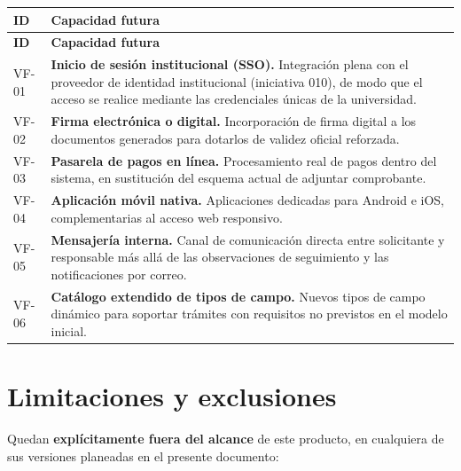 \documentclass[12pt,letterpaper]{report}
\begin{document}
\begin{longtable}{|C{1.6cm}|L{12cm}|}
    \hline
    \textbf{ID} & \textbf{Capacidad futura} \\
    \hline
    \endfirsthead
    \hline
    \textbf{ID} & \textbf{Capacidad futura} \\
    \hline
    \endhead
    \hline
    \endfoot

    VF-01 & \textbf{Inicio de sesión institucional (SSO).} Integración plena con el proveedor de identidad institucional (iniciativa 010), de modo que el acceso se realice mediante las credenciales únicas de la universidad. \\
    \hline
    VF-02 & \textbf{Firma electrónica o digital.} Incorporación de firma digital a los documentos generados para dotarlos de validez oficial reforzada. \\
    \hline
    VF-03 & \textbf{Pasarela de pagos en línea.} Procesamiento real de pagos dentro del sistema, en sustitución del esquema actual de adjuntar comprobante. \\
    \hline
    VF-04 & \textbf{Aplicación móvil nativa.} Aplicaciones dedicadas para Android e iOS, complementarias al acceso web responsivo. \\
    \hline
    VF-05 & \textbf{Mensajería interna.} Canal de comunicación directa entre solicitante y responsable más allá de las observaciones de seguimiento y las notificaciones por correo. \\
    \hline
    VF-06 & \textbf{Catálogo extendido de tipos de campo.} Nuevos tipos de campo dinámico para soportar trámites con requisitos no previstos en el modelo inicial. \\
    \hline
\end{longtable}

\section{Limitaciones y exclusiones}

Quedan \textbf{explícitamente fuera del alcance} de este producto, en cualquiera de sus versiones planeadas en el presente documento:
\end{document}
